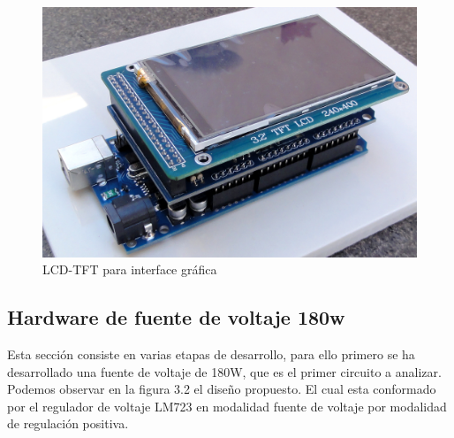 \begin{figure}[H]
\centering
\includegraphics[width=9
cm]{Capitulo3/figs/pantalla0.jpg}
\caption{LCD-TFT para interface gráfica}
\end{figure}
\subsection{Hardware de fuente de voltaje 180w}

Esta sección consiste en varias etapas de desarrollo, para ello primero se ha desarrollado una fuente de voltaje de 180W, que es el primer circuito a analizar. Podemos observar en la figura 3.2 el diseño propuesto. El cual esta conformado por el regulador de voltaje LM723 en modalidad fuente de voltaje por modalidad de regulación positiva.

